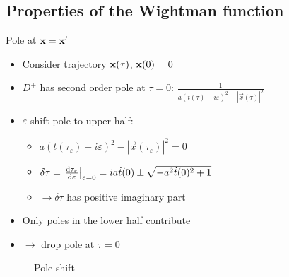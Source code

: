 \documentclass{beamer}
\renewcommand{\va}[1]{\vec{#1}}
\begin{document}
\subsection{Properties of the Wightman function}
\begin{frame}{Pole at \(\vb{x} = \vb{x}'\)}
\begin{itemize}
	\item Consider trajectory \(\vb{x}(\tau)\), \(\vb{x}(0) = 0\)
	\item \(D^+\) has second order pole at \(\tau = 0\): \(\frac{1}{a(t(\tau)-i\varepsilon)^2 - |\va{x}(\tau)|^2}\)
	\item \(\varepsilon\) shift pole to upper half:
	\begin{itemize}
		\item \(a(t(\tau_\varepsilon)-i\varepsilon)^2 - |\va{x}(\tau_\varepsilon)|^2 = 0\)
		\item \(\delta\tau = \eval{\dv{\tau_\varepsilon}{\varepsilon}}_{\varepsilon = 0} = ia\dot{t}(0) \pm \sqrt{-a^2 \dot{t}(0)^2 + 1}\)
		\item[] \(\to \delta\tau\) has positive imaginary part
	\end{itemize}
	\item Only poles in the lower half contribute 
	\item[] \(\to\) drop pole at \(\tau = 0\)
\end{itemize}
\begin{figure}
\centering
{}
\caption{Pole shift}
\end{figure}
\end{frame}
\end{document}
